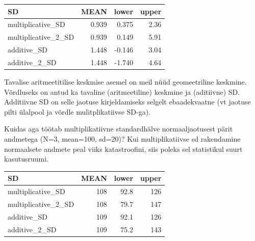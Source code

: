 \documentclass[]{book}
\newenvironment{Shaded}{\begin{snugshade}}{\end{snugshade}}
\newcommand{\KeywordTok}[1]{\textcolor[rgb]{0.13,0.29,0.53}{\textbf{#1}}}
\newcommand{\DataTypeTok}[1]{\textcolor[rgb]{0.13,0.29,0.53}{#1}}
\newcommand{\DecValTok}[1]{\textcolor[rgb]{0.00,0.00,0.81}{#1}}
\newcommand{\StringTok}[1]{\textcolor[rgb]{0.31,0.60,0.02}{#1}}
\newcommand{\CommentTok}[1]{\textcolor[rgb]{0.56,0.35,0.01}{\textit{#1}}}
\newcommand{\OperatorTok}[1]{\textcolor[rgb]{0.81,0.36,0.00}{\textbf{#1}}}
\newcommand{\NormalTok}[1]{#1}
\begin{document}
\begin{Shaded}
\end{Shaded}

\begin{tabular}{l|r|r|r}
\hline
SD & MEAN & lower & upper\\
\hline
multiplicative\_SD & 0.939 & 0.375 & 2.36\\
\hline
multiplicative\_2\_SD & 0.939 & 0.149 & 5.91\\
\hline
additive\_SD & 1.448 & -0.146 & 3.04\\
\hline
additive\_2\_SD & 1.448 & -1.740 & 4.64\\
\hline
\end{tabular}

Tavalise aritmeetitilise keskmise asemel on meil nüüd geomeetriline
keskmine. Võrdluseks on antud ka tavaline (aritmeetiline) keskmine ja
(aditiivne) SD. Additiivne SD on selle jaotuse kirjeldamiseks selgelt
ebaadekvaatne (vt jaotuse pilti ülalpool ja võrdle mulitplikatiivse
SD-ga).

Kuidas aga töötab multiplikatiivne standardhälve normaaljaotusest pärit
andmetega (N=3, mean=100, sd=20)? Kui multiplikatiivse sd rakendamine
normaalsete andmete peal viiks katastroofini, siis poleks sel
statistikul suurt kasutusruumi.

\begin{tabular}{l|r|r|r}
\hline
SD & MEAN & lower & upper\\
\hline
multiplicative\_SD & 108 & 92.8 & 126\\
\hline
multiplicative\_2\_SD & 108 & 79.7 & 147\\
\hline
additive\_SD & 109 & 92.1 & 126\\
\hline
additive\_2\_SD & 109 & 75.2 & 143\\
\hline
\end{tabular}
\end{document}
